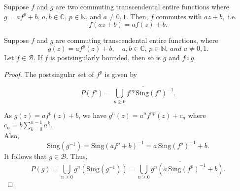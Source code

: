 \documentclass[10pt,a4paper]{amsart}
\begin{document}
	\begin{lemma}\label{l2}
		Suppose $f$ and $g$ are two commuting transcendental entire functions where $g=af^p+b,\, a,b\in \mathbb{C}$, $p\in \mathbb{N}$, and $a \neq 0,1$. Then, $f$ commutes with $az+b,$ i.e.
		\[
		f(az+b)=af(z)+b.
		\]
	\end{lemma}

	\begin{theorem} \label{th 2}
		Suppose $f$ and $g$ are commuting transcendental entire functions, where
		\[
		g(z) = a f^p(z) + b, \quad a,b \in \mathbb{C}, \, p\in \mathbb{N},  \, and \,\, a \neq 0,1.
		\]
	Let $f\in \mathcal{B}$.	If $f$ is postsingularly bounded, then so is $g$ and $f \circ g$.
	\end{theorem}

	\begin{proof} 
		The postsingular set of $f^p$ is given by 
		
		
		\[
		P(f^p) = \overline {\bigcup_{n \geq 0} f^{np} \mathrm{Sing}(f^p)^{-1}  }.
		\]
		
		As $g(z) = af^p(z) + b$, we have $g^n(z)=a^nf^{np}(z)+ c_n$ where $c_n= b \sum_{k=0}^{n-1} a^k$.\\
		Also,
		\[
		\mathrm{Sing}(g^{-1}) = \mathrm{Sing} (af^p + b)^{-1} 
		= a \, \mathrm{Sing}(f^p)^{-1} + b.
		\]
		It follows that $g\in \mathcal{B}$.
		Thus,
		\[
		P(g) = \overline {\bigcup_{n \geq 0} g^n \left( \mathrm{Sing}(g^{-1}) \right)}
		= \overline {\bigcup_{n \geq 0} g^n \left( a \, \mathrm{Sing}(f^p)^{-1} + b \right)}.
		\]
		

\end{proof}
\end{document}
